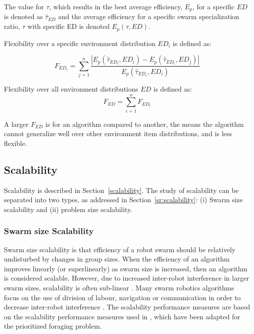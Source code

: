 The value for $\tau$, which results in the best average efficiency, $E_p$, for a specific $ED$ is denoted as $\hat{\tau}_{ED}$ and the average efficiency for a specific swarm specialization ratio, $\tau$ with specific ED is denoted $E_p(\tau, ED)$.

Flexibility over a specific environment distribution $ED_i$ is defined as:

\begin{equation}
F_{ED_i} = \sum_{j=1}^{n} \dfrac{|E_p(\hat{\tau}_{ED_i}, ED_i)-E_p(\hat{\tau}_{ED_i}, ED_j)|}{E_p(\hat{\tau}_{ED_i}, ED_i)}
\end{equation}

Flexibility over all environment distributions $ED$ is defined as:
\begin{equation}
	F_{ED} = \sum_{i=1}^{n} F_{ED_i}
\end{equation}

A larger $F_{ED}$ is for an algorithm compared to another, the means the algorithm cannot generalize well over other  environment item distributions, and is less flexible.

\subsection{Scalability}
\label{setup:scalability}

Scalability is described in Section~\ref{scalability}. The study of scalability can be separated into two types, as addressed in Section~\ref{sr:scalability}: (i) Swarm size scalability and (ii) problem size scalability.

\subsubsection{Swarm size Scalability}
\label{swarmsizescalability}
Swarm size scalability is that efficiency of a robot swarm should be relatively undisturbed by changes in group sizes. When the efficiency of an algorithm improves linearly (or superlinearly) as swarm size is increased, then an algorithm is considered scalable. However, due to increased inter-robot interference in larger swarm sizes, scalability is often sub-linear \cite{lerman2002mathematical}. Many swarm robotics algorithms focus on the use of division of labour, navigation or communication in order to decrease inter-robot interference \cite{lerman2002mathematical, schneider1998territorial}. The scalability performance measures are based on the scalability performance measures used in \cite{hecker2015beyond}, which have been adapted for the prioritized foraging problem.


